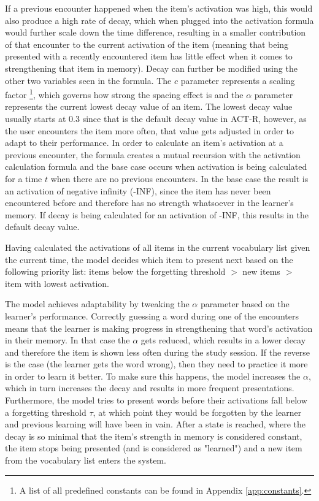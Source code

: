 \documentclass[a4paper]{report}
\begin{document}
If a previous encounter happened when the item's activation was high, this would also produce a high rate of decay, which when plugged into the activation formula would further scale down the time difference, resulting in a smaller contribution of that encounter to the current activation of the item (meaning that being presented with a recently encountered item has little effect when it comes to strengthening that item in memory). Decay can further be modified using the other two variables seen in the formula. The $c$ parameter represents a scaling factor \footnote{A list of all predefined constants can be found in Appendix \ref{app:constants}.}, which governs how strong the spacing effect is and the $\alpha$ parameter represents the current lowest decay value of an item. The lowest decay value usually starts at 0.3 since that is the default decay value in ACT-R, however, as the user encounters the item more often, that value gets adjusted in order to adapt to their performance. In order to calculate an item's activation at a previous encounter, the formula creates a mutual recursion with the activation calculation formula and the base case occurs when activation is being calculated for a time $t$ when there are no previous encounters. In the base case the result is an activation of negative infinity (-INF), since the item has never been encountered before and therefore has no strength whatsoever in the learner's memory. If decay is being calculated for an activation of -INF, this results in the default decay value.

Having calculated the activations of all items in the current vocabulary list given the current time, the model decides which item to present next based on the following priority list: items below the forgetting threshold $>$ new items $>$ item with lowest activation. \citep{sense15}

The model achieves adaptability by tweaking the $\alpha$ parameter based on the learner's performance. Correctly guessing a word during one of the encounters means that the learner is making progress in strengthening that word's activation in their memory. In that case the $\alpha$ gets reduced, which results in a lower decay and therefore the item is shown less often during the study session. If the reverse is the case (the learner gets the word wrong), then they need to practice it more in order to learn it better. To make sure this happens, the model increases the $\alpha$, which in turn increases the decay and results in more frequent presentations. Furthermore, the model tries to present words before their activations fall below a forgetting threshold $\tau$, at which point they would be forgotten by the learner and previous learning will have been in vain. After a state is reached, where the decay is so minimal that the item's strength in memory is considered constant, the item stops being presented (and is considered as "learned") and a new item from the vocabulary list enters the system.
\end{document}
